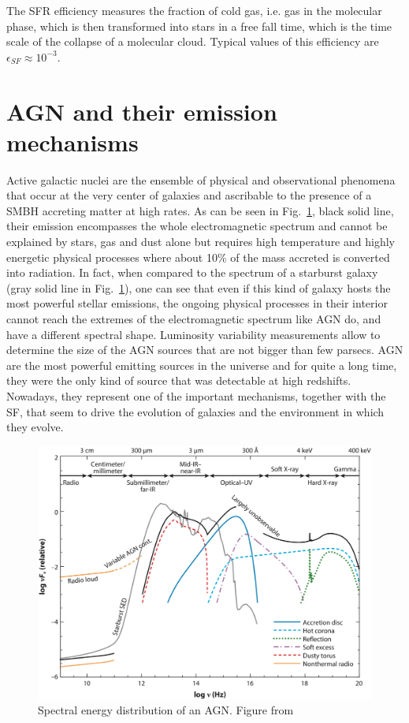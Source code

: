 The SFR efficiency measures the fraction of cold gas, i.e. gas in the molecular phase, which is then transformed into stars in a free fall time, which is the time scale of the collapse of a molecular cloud. Typical values of this efficiency are $\epsilon_{SF}\approx10^{-3}$. 

\section{AGN and their emission mechanisms}
Active galactic nuclei are the ensemble of physical and observational phenomena that occur at the very center of galaxies and ascribable to the presence of a SMBH accreting matter at high rates. As can be seen in Fig.~\ref{fig:AGN_SED}, black solid line, their emission encompasses the whole electromagnetic spectrum and cannot be explained by stars, gas and dust alone%
 but requires high temperature and highly energetic physical processes where about 10\% of the mass accreted is converted into radiation. In fact, when compared to the spectrum of a starburst galaxy (gray solid line in Fig.~\ref{fig:AGN_SED}), one can see that even if this kind of galaxy hosts the most powerful stellar emissions, the ongoing physical processes in their interior cannot reach the extremes of the electromagnetic spectrum like AGN do, and have a different spectral shape. Luminosity variability measurements allow to determine the size of the AGN sources that are not bigger than few parsecs. AGN are the most powerful emitting sources in the universe and for quite a long time, they were the only kind of source that was detectable at high redshifts. Nowadays, they represent one of the important mechanisms, together with the SF, that seem to drive the evolution of galaxies and the environment in which they evolve.

\begin{figure}
\begin{center}
  \includegraphics[width=\textwidth]{Figs/Intro/Fig1_Hickox18.pdf}
  \vspace{-30pt}
  \caption{Spectral energy distribution of an AGN. Figure from \citet{2018ARA&A..56..625H}}
    \label{fig:AGN_SED}
\end{center}
\end{figure}

